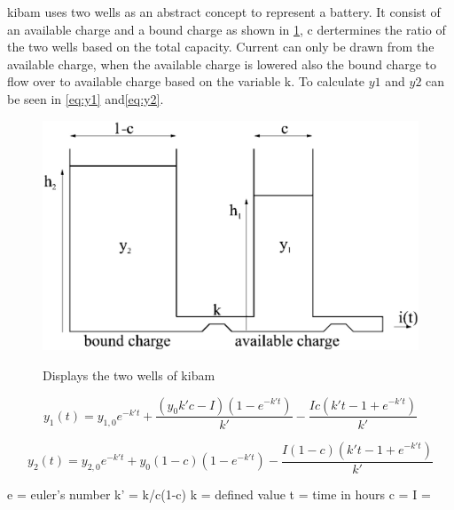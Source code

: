 \gls{kibam} uses two wells as an abstract concept to represent a battery. It consist of an available charge and a bound charge as shown in \cref{fig:kibam_wells}, c dertermines the ratio of the two wells based on the total capacity. Current can only be drawn from the available charge, when the available charge is lowered also the bound charge to flow over to available charge based on the variable k. To calculate $y{1}$ and $y{2}$ can be seen in \cref{eq:y1} and\cref{eq:y2}.

\begin{figure}
	\center
	\includegraphics[width=\textwidth/2]{graphics/kibam.jpg}
	\label{fig:kibam_wells}
	\caption{Displays the two wells of \gls{kibam}}
\end{figure}

\begin{equation}\label{eq:y1}
y_1(t) = y_{1,0}e^{-k't}+\frac{(y_0k'c-I)(1-e^{-k't})}{k'}-\frac{Ic(k't-1+e^{-k't})}{k'}
\end{equation}

\begin{equation}\label{eq:y2}
y_2(t) = y_{2,0}e^{-k't}+y_0(1-c)(1-e^{-k't})-\frac{I(1-c)(k't-1+e^{-k't})}{k'}
\end{equation}

e = euler's number
k' = k/c(1-c)
k = defined value
t = time in hours
c = 
I =

